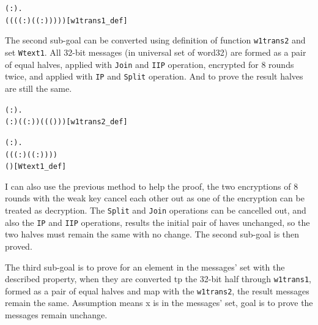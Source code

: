 \documentclass{article}
\begin{document}
\begin{alltt}
\HOLTokenTurnstile{} \HOLSymConst{\HOLTokenForall{}}( :).
       \HOLSymConst{=}
      ( ( ( ( :) (  ( :)) )))\hfill{[w1trans1_def]}
\end{alltt}

The second sub-goal can be converted using definition of function \verb|w1trans2| and set \verb|Wtext1|. All 32-bit messages
(in universal set of word32) are formed as a pair of equal halves, applied with \verb|Join| and \verb|IIP| operation, encrypted
for 8 rounds twice, and applied with \verb|IP| and \verb|Split| operation. And to prove the result halves are still the same.

\begin{alltt}
\HOLTokenTurnstile{} \HOLSymConst{\HOLTokenForall{}}( :).
       \HOLSymConst{=}
      ( :) (  ( :)) ( ( (\HOLSymConst{,})))\hfill{[w1trans2_def]}
\end{alltt}

\begin{alltt}
\HOLTokenTurnstile{}  \HOLSymConst{=}
   \HOLTokenLeftbrace{} \HOLTokenBar{}
    \HOLSymConst{\HOLTokenExists{}}( :).
       ( ( ( :) (  ( :)) )) \HOLSymConst{=}
      (\HOLSymConst{,})\HOLTokenRightbrace{}\hfill{[Wtext1_def]}
\end{alltt}

I can also use the previous method to help the proof, the two encryptions of 8 rounds with the weak key cancel each other out
as one of the encryption can be treated as decryption. The \verb|Split| and \verb|Join| operations can be cancelled out, and also the
\verb|IP| and \verb|IIP| operations, results the initial pair of haves unchanged, so the two halves must remain the same with no change.
The second sub-goal is then proved.

The third sub-goal is to prove for an element in the messages' set with the described property, when they are converted
tp the 32-bit half through \verb|w1trans1|, formed as a pair of equal halves and map with the \verb|w1trans2|, the result messages
remain the same. Assumption means x is in the messages' set, goal is to prove the messages remain unchange.
\end{document}
